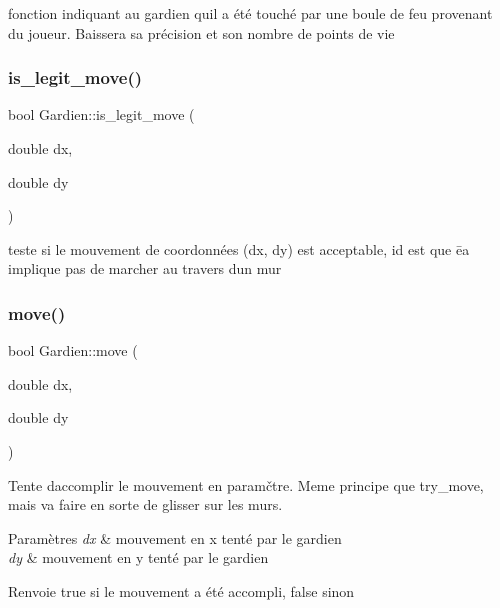 fonction indiquant au gardien qu\textquotesingle{}il a été touché par une boule de feu provenant du joueur. Baissera sa précision et son nombre de points de vie 

\mbox{\label{classGardien_aab71ebf5fb9fc0053459bac6bdd0f466}} 
\subsubsection{\texorpdfstring{is\+\_\+legit\+\_\+move()}{is\_legit\_move()}}
{\footnotesize\ttfamily bool Gardien\+::is\+\_\+legit\+\_\+move (\begin{DoxyParamCaption}\item[{double}]{dx,  }\item[{double}]{dy }\end{DoxyParamCaption})\hspace{0.3cm}{\ttfamily [private]}}



teste si le mouvement de coordonnées (dx, dy) est acceptable, id est que ēa implique pas de marcher au travers d\textquotesingle{}un mur 

\mbox{\label{classGardien_a1de6511bda736ad456457c51fa9d8d68}} 
\subsubsection{\texorpdfstring{move()}{move()}}
{\footnotesize\ttfamily bool Gardien\+::move (\begin{DoxyParamCaption}\item[{double}]{dx,  }\item[{double}]{dy }\end{DoxyParamCaption})\hspace{0.3cm}{\ttfamily [virtual]}}



Tente d\textquotesingle{}accomplir le mouvement en paramčtre. Meme principe que try\+\_\+move, mais va faire en sorte de glisser sur les murs. 


\begin{DoxyParams}{Paramètres}
{\em dx} & mouvement en x tenté par le gardien \\
\hline
{\em dy} & mouvement en y tenté par le gardien \\
\hline
\end{DoxyParams}
\begin{DoxyReturn}{Renvoie}
true si le mouvement a été accompli, false sinon 
\end{DoxyReturn}


